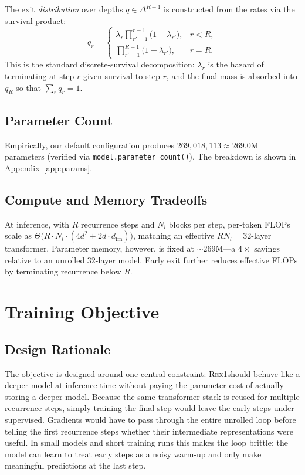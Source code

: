 \documentclass[11pt,a4paper]{article}
\newcommand{\REX}{\textsc{Rex1}\xspace}
\providecommand{\xspace}{}
\begin{document}
The exit \emph{distribution} over depths $q \in \Delta^{R-1}$ is constructed
from the rates via the survival product:
\begin{equation}
q_r = \begin{cases}
\lambda_r \prod_{r'=1}^{r-1}\bigl(1 - \lambda_{r'}\bigr), & r < R, \\[2pt]
\prod_{r'=1}^{R-1}\bigl(1 - \lambda_{r'}\bigr), & r = R.
\end{cases}
\label{eq:exit-dist}
\end{equation}
This is the standard discrete-survival decomposition: $\lambda_r$ is the
hazard of terminating at step $r$ given survival to step $r$, and the final
mass is absorbed into $q_R$ so that $\sum_r q_r = 1$.

\subsection{Parameter Count}

Empirically, our default configuration produces
$269{,}018{,}113 \approx 269.0\mathrm{M}$ parameters (verified via
\texttt{model.parameter\_count()}). The breakdown is shown in
Appendix~\ref{app:params}.

\subsection{Compute and Memory Tradeoffs}

At inference, with $R$ recurrence steps and $N_l$ blocks per step, per-token
FLOPs scale as
$\Theta\bigl(R \cdot N_l \cdot (4 d^2 + 2 d \cdot d_{\mathrm{ffn}})\bigr)$,
matching an effective $R N_l = 32$-layer transformer. Parameter memory,
however, is fixed at $\sim$269M---a $4\times$ savings relative to an
unrolled 32-layer model. Early exit further reduces effective FLOPs by
terminating recurrence below $R$.

\section{Training Objective}

\subsection{Design Rationale}

The objective is designed around one central constraint: \REX should behave like
a deeper model at inference time without paying the parameter cost of actually
storing a deeper model. Because the same transformer stack is reused for
multiple recurrence steps, simply training the final step would leave the early
steps under-supervised. Gradients would have to pass through the entire unrolled
loop before telling the first recurrence steps whether their intermediate
representations were useful. In small models and short training runs this makes
the loop brittle: the model can learn to treat early steps as a noisy warm-up and
only make meaningful predictions at the last step.
\end{document}
